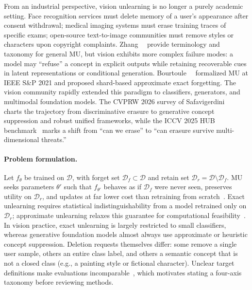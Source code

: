 \documentclass[10pt,twocolumn,letterpaper]{article}
\begin{document}
From an industrial perspective, vision unlearning is no longer a purely academic setting. Face recognition services must delete memory of a user's appearance after consent withdrawal; medical imaging systems must erase training traces of specific exams; open-source text-to-image communities must remove styles or characters upon copyright complaints. Zhang~\etal~\cite{zhang2023review} provide terminology and taxonomy for general MU, but vision exhibits more complex failure modes: a model may ``refuse'' a concept in explicit outputs while retaining recoverable cues in latent representations or conditional generation. Bourtoule~\etal~\cite{bourtoule2021} formalized MU at IEEE S\&P 2021 and proposed shard-based approximate exact forgetting. The vision community rapidly extended this paradigm to classifiers, generators, and multimodal foundation models. The CVPRW 2026 survey of Safavigerdini~\etal~\cite{safavigerdini2026} charts the trajectory from discriminative erasure to generative concept suppression and robust unified frameworks, while the ICCV 2025 HUB benchmark~\cite{moon2025hub} marks a shift from ``can we erase'' to ``can erasure survive multi-dimensional threats.''

\paragraph{Problem formulation.}
Let $f_\theta$ be trained on $\mathcal{D}$, with forget set $\mathcal{D}_f\subset\mathcal{D}$ and retain set $\mathcal{D}_r=\mathcal{D}\setminus\mathcal{D}_f$. MU seeks parameters $\theta'$ such that $f_{\theta'}$ behaves as if $\mathcal{D}_f$ were never seen, preserves utility on $\mathcal{D}_r$, and updates at far lower cost than retraining from scratch~\cite{bourtoule2021}. Exact unlearning requires statistical indistinguishability from a model retrained only on $\mathcal{D}_r$; approximate unlearning relaxes this guarantee for computational feasibility~\cite{zhang2023review}. In vision practice, exact unlearning is largely restricted to small classifiers, whereas generative foundation models almost always use approximate or heuristic concept suppression. Deletion requests themselves differ: some remove a single user sample, others an entire class label, and others a semantic concept that is not a closed class (e.g., a painting style or fictional character). Unclear target definitions make evaluations incomparable~\cite{zhang2023review}, which motivates stating a four-axis taxonomy before reviewing methods.
\end{document}
